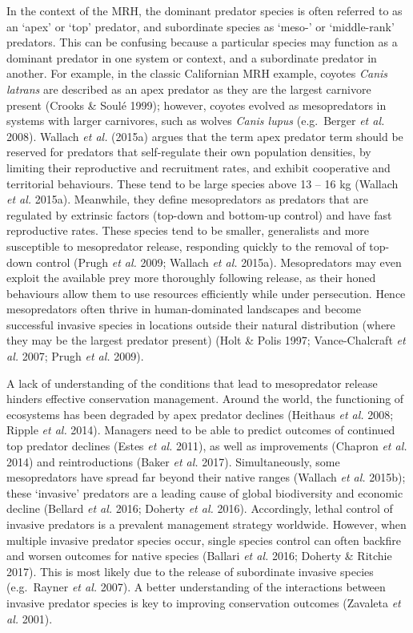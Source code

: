 \documentclass[11pt,a4paper,titlepage,twoside,openright]{style/unimelbthesis}
\begin{document}
\begin{mainmatter}
In the context of the MRH, the dominant predator species is often referred to as an `apex' or `top' predator, and subordinate species as `meso-' or `middle-rank' predators. This can be confusing because a particular species may function as a dominant predator in one system or context, and a subordinate predator in another. For example, in the classic Californian MRH example, coyotes \emph{Canis latrans} are described as an apex predator as they are the largest carnivore present (Crooks \& Soulé 1999); however, coyotes evolved as mesopredators in systems with larger carnivores, such as wolves \emph{Canis lupus} (e.g.~Berger \emph{et al.} 2008). Wallach \emph{et al.} (2015a) argues that the term apex predator term should be reserved for predators that self-regulate their own population densities, by limiting their reproductive and recruitment rates, and exhibit cooperative and territorial behaviours. These tend to be large species above 13 -- 16 kg (Wallach \emph{et al.} 2015a). Meanwhile, they define mesopredators as predators that are regulated by extrinsic factors (top-down and bottom-up control) and have fast reproductive rates. These species tend to be smaller, generalists and more susceptible to mesopredator release, responding quickly to the removal of top-down control (Prugh \emph{et al.} 2009; Wallach \emph{et al.} 2015a). Mesopredators may even exploit the available prey more thoroughly following release, as their honed behaviours allow them to use resources efficiently while under persecution. Hence mesopredators often thrive in human-dominated landscapes and become successful invasive species in locations outside their natural distribution (where they may be the largest predator present) (Holt \& Polis 1997; Vance-Chalcraft \emph{et al.} 2007; Prugh \emph{et al.} 2009).

A lack of understanding of the conditions that lead to mesopredator release hinders effective conservation management. Around the world, the functioning of ecosystems has been degraded by apex predator declines (Heithaus \emph{et al.} 2008; Ripple \emph{et al.} 2014). Managers need to be able to predict outcomes of continued top predator declines (Estes \emph{et al.} 2011), as well as improvements (Chapron \emph{et al.} 2014) and reintroductions (Baker \emph{et al.} 2017). Simultaneously, some mesopredators have spread far beyond their native ranges (Wallach \emph{et al.} 2015b); these `invasive' predators are a leading cause of global biodiversity and economic decline (Bellard \emph{et al.} 2016; Doherty \emph{et al.} 2016). Accordingly, lethal control of invasive predators is a prevalent management strategy worldwide. However, when multiple invasive predator species occur, single species control can often backfire and worsen outcomes for native species (Ballari \emph{et al.} 2016; Doherty \& Ritchie 2017). This is most likely due to the release of subordinate invasive species (e.g.~Rayner \emph{et al.} 2007). A better understanding of the interactions between invasive predator species is key to improving conservation outcomes (Zavaleta \emph{et al.} 2001).


\end{mainmatter}
\end{document}
